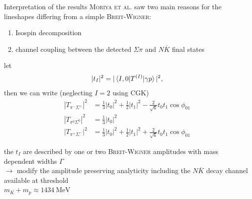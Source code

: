 \documentclass[11pt,aspectratio=1610,dvipsnames]{beamer}
\begin{document}
\begin{frame}{Interpretation of the results}
	\textsc{Moriya et al.} saw two main reasons for the lineshapes differing from a simple \textsc{Breit-Wigner}:
	\begin{enumerate}
		\item Isospin decomposition
		\item channel coupling between the detected $\Sigma\pi$ and $N\overline{K}$ final states
	\end{enumerate}
\begin{minipage}{.56\linewidth}
	\begin{tcolorbox}[colback=black!10,colframe=gray!20!black,title=Isospin decomposition] 
		let $$|t_I|^2=|\braket{I,0|T^{(I)}|\gamma p}|^2,$$
		then we can write (neglecting $I=2$ using CGK)
		\vspace{-0.5cm}
		\begin{align*}
			|T_{\pi^-\Sigma^+}|^2&=\frac{1}{3}|t_0|^2+\frac{1}{2}|t_1|^2-\frac{2}{\sqrt{6}}t_0t_1\cos\phi_{01}\\
			|T_{\pi^0\Sigma^0}|^2&=\frac{1}{3}|t_0|^2\\
			|T_{\pi^+\Sigma^-}|^2&=\frac{1}{3}|t_0|^2+\frac{1}{2}|t_1|^2+\frac{2}{\sqrt{6}}t_0t_1\cos\phi_{01}
		\end{align*}
	\end{tcolorbox}
\end{minipage}
\begin{minipage}{.43\linewidth}
	\begin{tcolorbox}[colback=black!10,colframe=gray!20!black,title=Channel coupling]
		the $t_I$ are described by one or two \textsc{Breit-Wigner} amplitudes with mass dependent widths $\Gamma$ \\
		$\to$ modify the amplitude preserving analyticity \citet{flatte} including the $N\overline{K}$ decay channel available at threshold\\ $m_K+m_p\approx\SI{1434}{\mega\eV}$

	\end{tcolorbox}
\end{minipage}

\end{frame}
\end{document}

